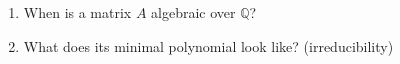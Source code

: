 \documentclass[preview]{standalone}
\begin{document}
\begin{center}
\begin{enumerate} \item When is a matrix $A$ algebraic over $\mathbb{Q}$? \item What does its minimal polynomial look like? (irreducibility) \end{enumerate}
\end{center}
\end{document}
